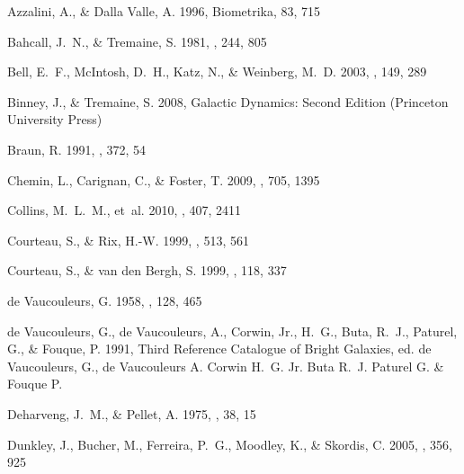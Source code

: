 \documentclass[preprint]{aastex}
\begin{document}
\begin{thebibliography}{}

{Azzalini}, A., \& {Dalla Valle}, A. 1996, Biometrika, 83, 715

{Bahcall}, J.~N., \& {Tremaine}, S. 1981, \apj, 244, 805

{Bell}, E.~F., {McIntosh}, D.~H., {Katz}, N., \& {Weinberg}, M.~D. 2003, \apjs,
  149, 289

{Binney}, J., \& {Tremaine}, S. 2008, {Galactic Dynamics: Second Edition}
  (Princeton University Press)

{Braun}, R. 1991, \apj, 372, 54

{Chemin}, L., {Carignan}, C., \& {Foster}, T. 2009, \apj, 705, 1395

{Collins}, M.~L.~M., {et~al.} 2010, \mnras, 407, 2411

{Courteau}, S., \& {Rix}, H.-W. 1999, \apj, 513, 561

{Courteau}, S., \& {van den Bergh}, S. 1999, \aj, 118, 337

{de Vaucouleurs}, G. 1958, \apj, 128, 465

{de Vaucouleurs}, G., {de Vaucouleurs}, A., {Corwin}, Jr., H.~G., {Buta},
  R.~J., {Paturel}, G., \& {Fouque}, P. 1991, {Third Reference Catalogue of
  Bright Galaxies}, ed. {de Vaucouleurs, G., de Vaucouleurs A. Corwin H.~G. Jr.
  Buta R.~J. Paturel G. \& Fouque P.}

{Deharveng}, J.~M., \& {Pellet}, A. 1975, \aap, 38, 15

{Dunkley}, J., {Bucher}, M., {Ferreira}, P.~G., {Moodley}, K., \& {Skordis}, C.
  2005, \mnras, 356, 925


\end{thebibliography}
\end{document}

